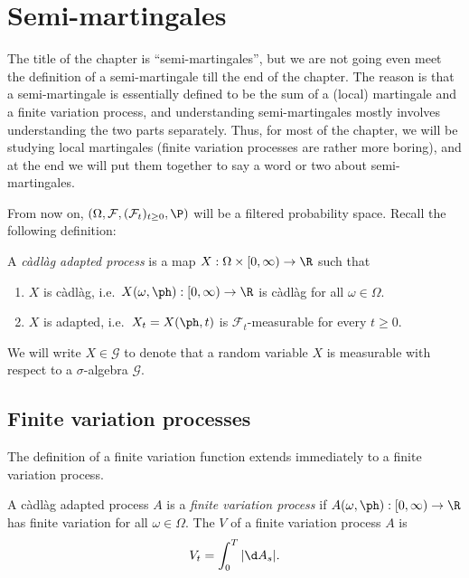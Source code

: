 \documentclass[a4paper]{article}
\begin{document}
\section{Semi-martingales}
The title of the chapter is ``semi-martingales'', but we are not going even meet the definition of a semi-martingale till the end of the chapter. The reason is that a semi-martingale is essentially defined to be the sum of a (local) martingale and a finite variation process, and understanding semi-martingales mostly involves understanding the two parts separately. Thus, for most of the chapter, we will be studying local martingales (finite variation processes are rather more boring), and at the end we will put them together to say a word or two about semi-martingales. 

From now on, $(\Omega, \mathcal{F}, (\mathcal{F}_t)_{t \geq 0}, \P)$ will be a filtered probability space. Recall the following definition:

\begin{defi}
  A \emph{c\`adl\`ag adapted process} is a map $X: \Omega \times [0, \infty) \to \R$ such that
  \begin{enumerate}
    \item $X$ is c\`adl\`ag, i.e.\ $X(\omega, \ph): [0, \infty) \to \R$ is c\`adl\`ag for all $\omega \in \Omega$.
    \item $X$ is adapted, i.e.\ $X_t = X(\ph, t) $ is $\mathcal{F}_t$-measurable for every $t \geq 0$.
  \end{enumerate}
\end{defi}

\begin{notation}
  We will write $X \in \mathcal{G}$ to denote that a random variable $X$ is measurable with respect to a $\sigma$-algebra $\mathcal{G}$.
\end{notation}

\subsection{Finite variation processes}
The definition of a finite variation function extends immediately to a finite variation process.
\begin{defi}
  A c\`adl\`ag adapted process $A$ is a \emph{finite variation process} if $A(\omega, \ph): [0, \infty) \to \R$ has finite variation for all $\omega \in \Omega$. The  $V$ of a finite variation process $A$ is
  \[
    V_t = \int_0^T |\d A_s|.
  \]
\end{defi}
\end{document}
